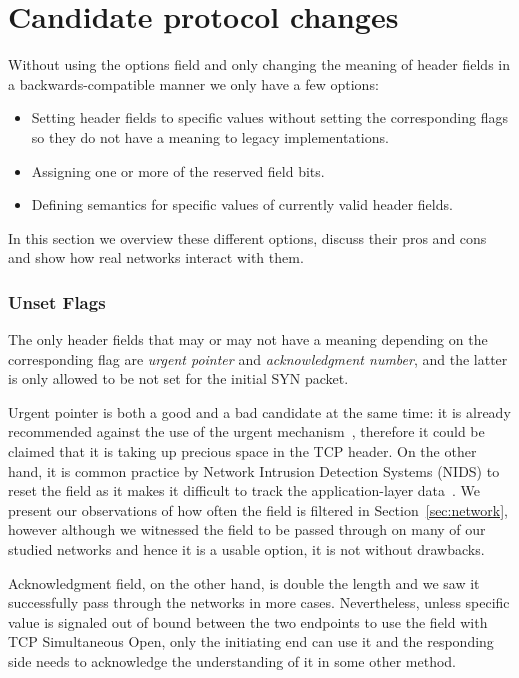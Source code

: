 \documentclass{sig-alternate-10pt}
\begin{document}
\section{Candidate protocol changes}
\label{sec:protocolChanges}

Without using the options field and only changing the meaning of header fields in a backwards-compatible manner we only have a few options:
\begin{itemize}
    \item Setting header fields to specific values without setting the corresponding flags so they do not have a meaning to legacy implementations.
    \item Assigning one or more of the reserved field bits.
    \item Defining semantics for specific values of currently valid header fields.
\end{itemize}

In this section we overview these different options, discuss their pros and cons and show how real networks interact with them.

\subsubsection*{Unset Flags}
\label{sec:unset}

The only header fields that may or may not have a meaning depending on the corresponding flag are \emph{urgent pointer} and \emph{acknowledgment number}, and the latter is only allowed to be not set for the initial SYN packet.

Urgent pointer is both a good and a bad candidate at the same time: it is already recommended against the use of the urgent mechanism~\cite{Gont:2011vi}, therefore it could be claimed that it is taking up precious space in the TCP header. On the other hand, it is common practice by Network Intrusion Detection Systems (NIDS) to reset the field as it makes it difficult to track the application-layer data~\cite{seolma}. We present our observations of how often the field is filtered in Section~\ref{sec:network}, however although we witnessed the field to be passed through on many of our studied networks and hence it is a usable option, it is not without drawbacks.

Acknowledgment field, on the other hand, is double the length and we saw it successfully pass through the networks in more cases. Nevertheless, unless specific value is signaled out of bound between the two endpoints to use the field with TCP Simultaneous Open, only the initiating end can use it and the responding side needs to acknowledge the understanding of it in some other method. 
\end{document}
